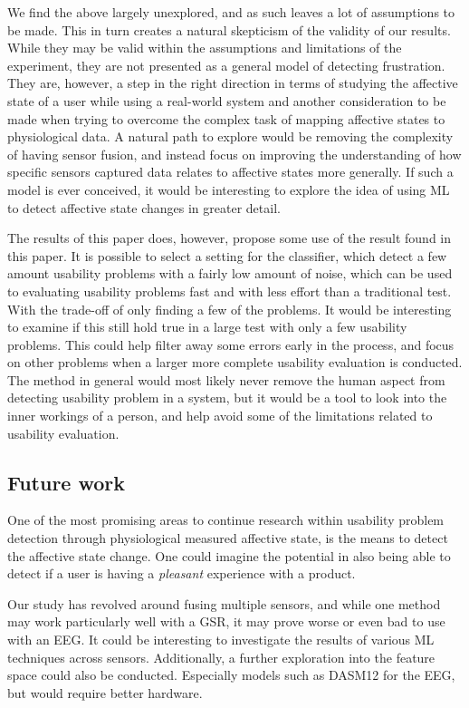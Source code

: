 We find the above largely unexplored, and as such leaves a lot of assumptions to be made.
This in turn creates a natural skepticism of the validity of our results.
While they may be valid within the assumptions and limitations of the experiment, they are not presented as a general model of detecting frustration. 
They are, however, a step in the right direction in terms of studying the affective state of a user while using a real-world system and another consideration to be made when trying to overcome the complex task of mapping affective states to physiological data. 
A natural path to explore would be removing the complexity of having sensor fusion, and instead focus on improving the understanding of how specific sensors captured data relates to affective states more generally. 
If such a model is ever conceived, it would be interesting to explore the idea of using ML to detect affective state
changes in greater detail.

The results of this paper does, however, propose some use of the result found in this paper.
It is possible to select a setting for the classifier, which detect a few amount usability problems with a fairly low amount of noise, which can be used to evaluating usability problems fast and with less effort than a traditional test. With the trade-off of only finding a few of the problems.
It would be interesting to examine if this still hold true in a large test with only a few usability problems.
This could help filter away some errors early in the process, and focus on other problems when a larger more complete usability evaluation is conducted. 
The method in general would most likely never remove the human aspect from detecting usability problem in a system, but it would be a tool to look into the inner workings of a person, and help avoid some of the limitations related to usability evaluation.

\subsection{Future work}
One of the most promising areas to continue research within usability problem detection through physiological measured
affective state, is the means to detect the affective state change. One could imagine the potential in also being able
to detect if a user is having a \textit{pleasant} experience with a product.

Our study has revolved around fusing multiple sensors, and while one method may work particularly well with a GSR, it may prove worse or even bad to use with an EEG. 
It could be interesting to investigate the results of various ML techniques across sensors.
Additionally, a further exploration into the feature space could also be conducted. 
Especially models such as DASM12\cite{eeg_music_listening} for the EEG, but would require better hardware.

